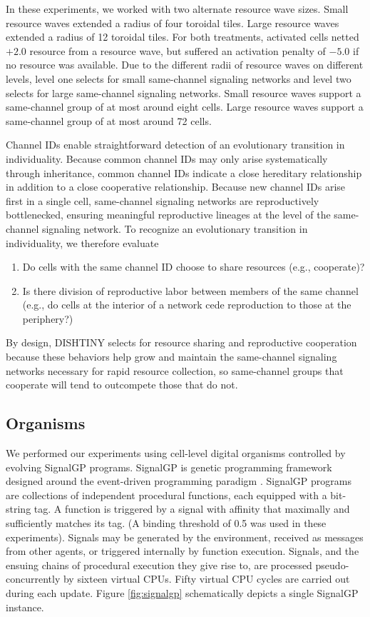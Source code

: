 In these experiments, we worked with two alternate resource wave sizes.
Small resource waves extended a radius of four toroidal tiles.
Large resource waves extended a radius of 12 toroidal tiles.
For both treatments, activated cells netted $+2.0$ resource from a resource wave, but suffered an activation penalty of $-5.0$ if no resource was available.
Due to the different radii of resource waves on different levels, level one selects for small same-channel signaling networks and level two selects for large same-channel signaling networks.
Small resource waves support a same-channel group of at most around eight cells.
Large resource waves support a same-channel group of at most around 72 cells.

Channel IDs enable straightforward detection of an evolutionary transition in individuality.
Because common channel IDs may only arise systematically through inheritance, common channel IDs indicate a close hereditary relationship in addition to a close cooperative relationship.
Because new channel IDs arise first in a single cell, same-channel signaling networks are reproductively bottlenecked, ensuring meaningful reproductive lineages at the level of the same-channel signaling network.
To recognize an evolutionary transition in individuality, we therefore evaluate
\begin{enumerate}
\item Do cells with the same channel ID choose to share resources (e.g., cooperate)?
\item Is there division of reproductive labor between members of the same channel (e.g., do cells at the interior of a network cede reproduction to those at the periphery?)
\end{enumerate}
By design, DISHTINY selects for resource sharing and reproductive cooperation because these behaviors help grow and maintain the same-channel signaling networks necessary for rapid resource collection, so same-channel groups that cooperate will tend to outcompete those that do not.

\subsection{Organisms}



We performed our experiments using cell-level digital organisms controlled by evolving SignalGP programs.
SignalGP is genetic programming framework designed around the event-driven programming paradigm \cite{lalejini2018evolving}.
SignalGP programs are collections of independent procedural functions, each equipped with a bit-string tag.
A function is triggered by a signal with affinity that maximally and sufficiently matches its tag.
(A binding threshold of 0.5 was used in these experiments).
Signals may be generated by the environment, received as messages from other agents, or triggered internally by function execution.
Signals, and the ensuing chains of procedural execution they give rise to, are processed pseudo-concurrently by sixteen virtual CPUs.
Fifty virtual CPU cycles are carried out during each update.
Figure \ref{fig:signalgp} schematically depicts a single SignalGP instance.


